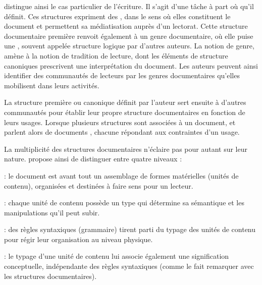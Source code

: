 \citeauthor{Prie2000} distingue ainsi le cas particulier de l'écriture.
Il s'agit d'une tâche à part où  qu'il définit. 
Ces structures expriment des , dans le sens où elles constituent le document et permettent sa médiatisation auprès d'un lectorat.
Cette structure documentaire première renvoit également à un genre documentaire, où elle puise une , souvent appelée structure logique par d'autres auteurs.
La notion de genre, amène à la notion de tradition de lecture, dont les éléments de structure canoniques prescrivent une interprétation du document.
Les auteurs peuvent ainsi identifier des communautés de lecteurs par les genres documentaires qu'elles mobilisent dans leurs activités.

La structure première ou canonique définit par l'auteur sert ensuite à d'autres communautés pour établir leur propre structure documentaires en fonction de leurs usages.
Lorsque plusieurs structures sont associées à un document, \cite{Abascal2003} et \cite{Abascal2004} parlent alors de documents , chacune répondant aux contraintes d'un usage.

La multiplicité des structures documentaires n'éclaire pas pour autant sur leur nature.
\cite[p.191-192]{bachimont:icc} propose ainsi de distinguer entre quatre niveaux :
\begin{liste}
 	\item {} : le document est avant tout un assemblage de formes matérielles (unités de contenu), organisées et destinées à faire sens pour un lecteur.

 	\item {} : chaque unité de contenu possède un type qui détermine sa sémantique et les manipulations qu'il peut subir.
 
 	\item {} : des règles syntaxiques (grammaire) tirent parti du typage des unités de contenu pour régir leur organisation au niveau physique. 

 	\item {} : le typage d'une unité de contenu lui associe également une signification conceptuelle, indépendante des règles syntaxiques (comme \citeauthor{Prie2000} le fait remarquer avec les structures documentaires).
\end{liste}


